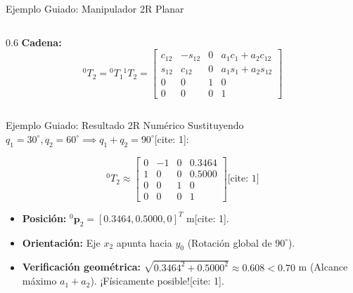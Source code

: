 \documentclass[aspectratio=169, table, xcdraw]{beamer}
\begin{document}
\begin{frame}{Ejemplo Guiado: Manipulador 2R Planar}
\begin{columns}
\begin{column}{0.6\textwidth}
            \textbf{Cadena:}
            \footnotesize
            \begin{equation*}
                {}^{0}T_2 = {}^{0}T_1 {}^{1}T_2 = \begin{bmatrix}
                c_{12} & -s_{12} & 0 & a_1 c_1 + a_2 c_{12} \\
                s_{12} & c_{12} & 0 & a_1 s_1 + a_2 s_{12} \\
                0 & 0 & 1 & 0 \\
                0 & 0 & 0 & 1
                \end{bmatrix}
            \end{equation*}
        \end{column}
    \end{columns}
\end{frame}

\begin{frame}{Ejemplo Guiado: Resultado 2R Numérico}
    Sustituyendo $q_1 = 30^\circ, q_2 = 60^\circ \implies q_1+q_2 = 90^\circ$[cite: 1]:
    
    \begin{equation*}
        \boxed{
        {}^{0}T_2 \approx
        \begin{bmatrix}
        0 & -1 & 0 & 0.3464 \\
        1 & 0 & 0 & 0.5000 \\
        0 & 0 & 1 & 0 \\
        0 & 0 & 0 & 1
        \end{bmatrix}
        } \text{[cite: 1]}
    \end{equation*}

    \begin{itemize}
        \item \textbf{Posición:} ${}^{0}\mathbf{p}_2 = [0.3464, 0.5000, 0]^T$ m[cite: 1].
        \item \textbf{Orientación:} Eje $x_2$ apunta hacia $y_0$ (Rotación global de $90^\circ$).
        \item \textbf{Verificación geométrica:} $\sqrt{0.3464^2 + 0.5000^2} \approx 0.608 < 0.70$ m (Alcance máximo $a_1+a_2$). ¡Físicamente posible![cite: 1].
    \end{itemize}
\end{frame}
\end{document}
